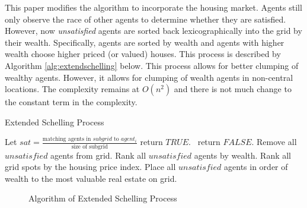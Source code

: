 {This paper modifies the algorithm to incorporate the housing market. Agents still only observe the race of other agents to determine whether they are satisfied. However, now \textit{unsatisfied} agents are sorted back lexicographically into the grid by their wealth. Specifically, agents are sorted by wealth and agents with higher wealth choose higher priced (or valued) houses. This process is described by Algorithm \ref{alg:extendschelling} below. This process allows for better clumping of wealthy agents. However, it allows for clumping of wealth agents in non-central locations. The complexity remains at $O(n^2)$ and there is not much change to the constant term in the complexity.

 \begin{algorithm}[htbp!]
  \caption{Extended Schelling Process}\label{alg:extendschelling}
  \begin{algorithmic}[1]
        	\State Let $sat = \frac{\text{matching agents in $subgrid$ to $agent_i$}}{\text{size of subgrid}}$
       			\State return $TRUE$. 
                \Else \ return $FALSE$. 
    		\EndIf
        \EndProcedure
        	\State Remove all $unsatisfied$ agents from grid.
            \State Rank all $unsatisfied$ agents by wealth.
            \State Rank all grid spots by the housing price index.
            \State Place all $unsatisfied$ agents in order of wealth to the most valuable real estate on grid.
        \EndWhile{}
  	\EndFunction{}
  \end{algorithmic}
  \end{algorithm}
  \begin{figure}[h!]
\caption{Algorithm of Extended Schelling Process}
\end{figure}

}
